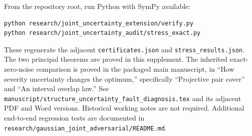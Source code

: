 \documentclass[11pt,letterpaper]{article}
\begin{document}
From the repository root, run Python with SymPy available:
\begin{verbatim}
python research/joint_uncertainty_extension/verify.py
python research/joint_uncertainty_audit/stress_exact.py
\end{verbatim}
These regenerate the adjacent \texttt{certificates.json} and \texttt{stress\_results.json}. The two principal theorems are proved in this supplement. The inherited exact-zero-noise comparison is proved in the packaged main manuscript, in ``How severity uncertainty changes the optimum,'' specifically ``Projective pair cover'' and ``An interval overlap law.'' See \texttt{manuscript/structure\_uncertainty\_fault\_diagnosis.tex} and its adjacent PDF and Word versions. Historical working notes are not required. Additional end-to-end regression tests are documented in \texttt{research/gaussian\_joint\_adversarial/README.md}.
\end{document}
